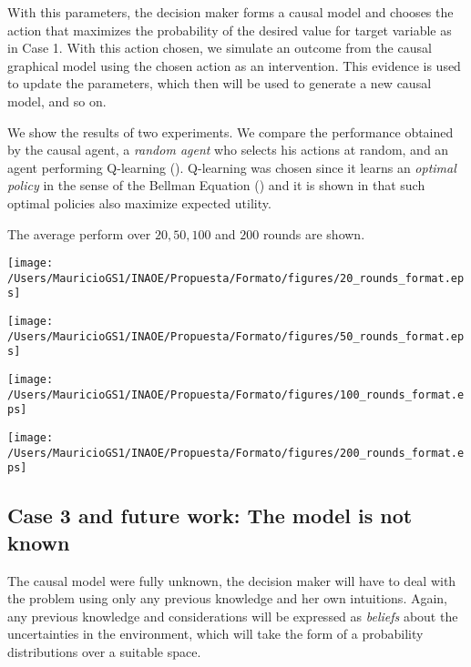 \documentclass[english,letterpaper,12pt,final]{article}
\theoremstyle{definition}
\begin{document}
With this parameters, the decision maker forms a causal model and chooses the action that maximizes the probability of the desired value for target variable as in Case 1.  With this action chosen, we simulate an outcome from the causal graphical model using the chosen action as an intervention. This evidence is used to update the parameters, which then will be used to generate a new causal model, and so on.

We show the results of two experiments. We compare the performance obtained by the causal agent, a \textit{random agent} who selects his actions at random, and an agent performing Q-learning (\cite{watkins1992q}). Q-learning was chosen since it learns an \textit{optimal policy} in the sense of the Bellman Equation (\cite{sutton1998reinforcement}) and it is shown in \cite{webb2007game} that such optimal policies also maximize expected utility. 

The average perform over $20, 50, 100$ and $200$ rounds are shown.


\begin{center}
\begin{minipage}{0.48\linewidth}
\texttt{[image: /Users/MauricioGS1/INAOE/Propuesta/Formato/figures/20\_rounds\_format.eps]}
\end{minipage}%
\hfill
\begin{minipage}{0.49\linewidth}
\texttt{[image: /Users/MauricioGS1/INAOE/Propuesta/Formato/figures/50\_rounds\_format.eps]}
\end{minipage}
\end{center}
\begin{center}
\begin{minipage}{0.49\linewidth}
\texttt{[image: /Users/MauricioGS1/INAOE/Propuesta/Formato/figures/100\_rounds\_format.eps]}
\end{minipage}
\hfill
\begin{minipage}{0.49\linewidth}
\texttt{[image: /Users/MauricioGS1/INAOE/Propuesta/Formato/figures/200\_rounds\_format.eps]}
\end{minipage}
\end{center}

\subsection{Case 3 and future work: The model is not known}
The causal model were fully unknown, the decision maker will have to deal with the problem using only any previous knowledge and her own intuitions. Again, any previous knowledge and considerations will be expressed as \textit{beliefs} about the uncertainties in the environment, which will take the form of a probability distributions over a suitable space. 
\end{document}

